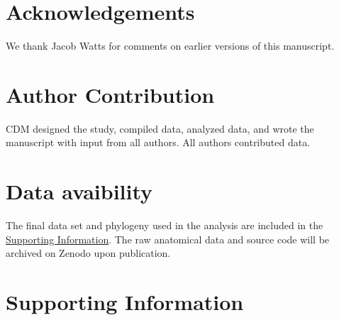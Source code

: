 \documentclass[
  10pt,
]{article}
\begin{document}
\hypertarget{acknowledgements}{%
\section{Acknowledgements}\label{acknowledgements}}

We thank Jacob Watts for comments on earlier versions of this manuscript.

\hypertarget{author-contribution}{%
\section{Author Contribution}\label{author-contribution}}

CDM designed the study, compiled data, analyzed data, and wrote the manuscript with input from all authors. All authors contributed data.

\hypertarget{data-avaibility}{%
\section{Data avaibility}\label{data-avaibility}}

The final data set and phylogeny used in the analysis are included in the \protect\hyperlink{supporting-information}{Supporting Information}. The raw anatomical data and source code will be archived on Zenodo upon publication.

\clearpage

\hypertarget{supporting-information}{%
\section{Supporting Information}\label{supporting-information}}

\renewcommand\thefigure{S\arabic{figure}}    
\renewcommand\thetable{S\arabic{table}}    
\setcounter{figure}{0}    
\setcounter{table}{0}
\end{document}
